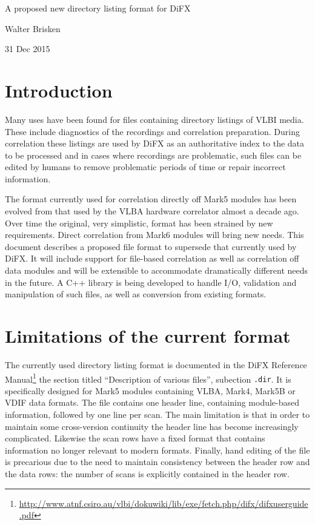 \documentclass[12pt]{article}
\begin{document}
\begin{center}

\vspace{10pt}
{\Large A proposed new directory listing format for DiFX}

\vspace{15pt}
Walter Brisken

\vspace{5pt}
31 Dec 2015
\end{center}

\section{Introduction}

Many uses have been found for files containing directory listings of VLBI media.
These include diagnostics of the recordings and correlation preparation.
During correlation these listings are used by DiFX as an authoritative index to the data to be processed and in cases where recordings are problematic, such files can be edited by humans to remove problematic periods of time or repair incorrect information.

The format currently used for correlation directly off Mark5 modules has been evolved from that used by the VLBA hardware correlator almost a decade ago.
Over time the original, very simplistic, format has been strained by new requirements.
Direct correlation from Mark6 modules will bring new needs.
This document describes a proposed file format to supersede that currently used by DiFX.
It will include support for file-based correlation as well as correlation off data modules and will be extensible to accommodate dramatically different needs in the future.
A C++ library is being developed to handle I/O, validation and manipulation of such files, as well as conversion from existing formats.

\section{Limitations of the current format}

The currently used directory listing format is documented in the DiFX Reference Manual\footnote{\url{http://www.atnf.csiro.au/vlbi/dokuwiki/lib/exe/fetch.php/difx/difxuserguide.pdf}} the section titled ``Description of various files'', subection {\tt .dir}.
It is specifically designed for Mark5 modules containing VLBA, Mark4, Mark5B or VDIF data formats.
The file contains one header line, containing module-based information, followed by one line per scan.
The main limitation is that in order to maintain some cross-version continuity the header line has become increasingly complicated.
Likewise the scan rows have a fixed format that contains information no longer relevant to modern formats.
Finally, hand editing of the file is precarious due to the need to maintain consistency between the header row and the data rows: the number of scans is explicitly contained in the header row.
\end{document}
